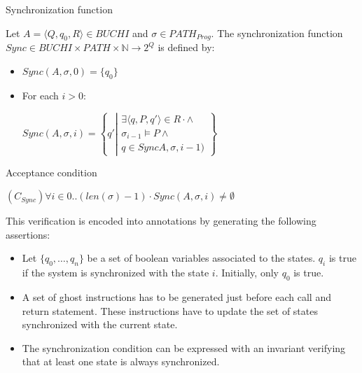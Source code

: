 \documentclass{report}
\begin{document}
\begin{definition}{Synchronization function}
\label{def-synchro}

Let
${A=\langle Q,q_0,R \rangle \in \textit{BUCHI}}$ and
${\sigma \in \textit{PATH}_{\textit{Prog}}}$.
The synchronization function ${\textit{Sync}\in\textit{BUCHI} \times
  \textit{PATH} \times \mathbb{N} \rightarrow 2^Q}$ is defined by:

\begin{itemize}
\item $\textit{Sync}(A,\sigma,0) = \{q_0\}$
\item {\color{darkgray}For each $i>0$:}

\centerline{
${\textit{Sync}(A,\sigma,i) =
 \left \{ q' \left |  \begin{array}{c}
                                        \exists \langle q,P,q' \rangle
                                        \in R \cdot \wedge\\
                                        \sigma_{i-1} \models
                                        P \wedge\\
                                        q \in
                                        \textit{Sync}A,\sigma,i-1)
                                      \end{array}
  \right . \right \}} $}
\end{itemize}
\end{definition}

\begin{definition}{Acceptance condition}

\centering
$(C_{Sync})$\hfill $\forall i \in 0..(\textit{len}(\sigma)-1) \cdot
\textit{Sync}(A,\sigma,i) \not = \emptyset$\hfill ~
\end{definition}

This verification is encoded into annotations by generating the following assertions:

\begin{itemize}
  \item[Declaration] Let $\{q_0,\dots,q_n\}$ be a set of boolean variables
    associated to the states. $q_i$ is true if the system is synchronized with
    the state $i$. Initially, only $q_0$ is true.
  \item[Transitions] A set of ghost instructions has to be generated just before
    each call and return statement. These instructions have to update the set of
    states synchronized with the current state.
  \item[Synchronization] The synchronization condition can be expressed with an
    invariant verifying that at least one state is always synchronized.
\end{itemize}
\end{document}

